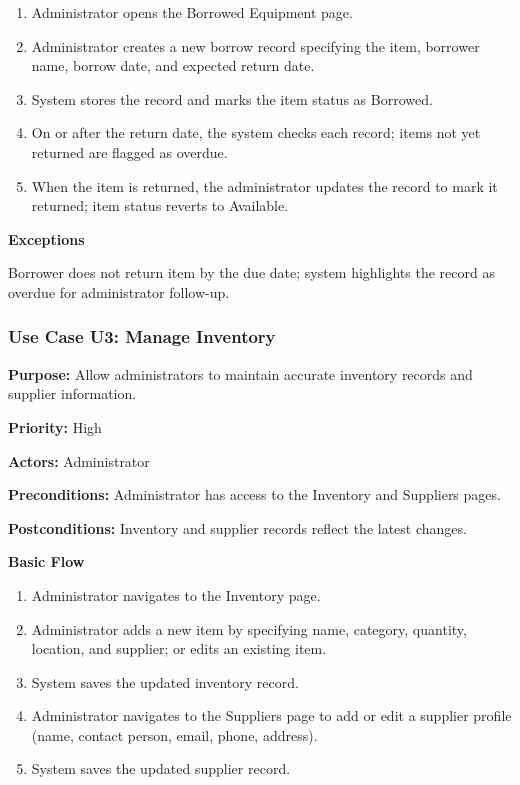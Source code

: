 \documentclass[12pt]{article}
\begin{document}
\begin{enumerate}
\item Administrator opens the Borrowed Equipment page.
\item Administrator creates a new borrow record specifying the item, borrower name, borrow date, and expected return date.
\item System stores the record and marks the item status as Borrowed.
\item On or after the return date, the system checks each record; items not yet returned are flagged as overdue.
\item When the item is returned, the administrator updates the record to mark it returned; item status reverts to Available.
\end{enumerate}

\textbf{Exceptions}

Borrower does not return item by the due date; system highlights the record as overdue for administrator follow-up.

\subsubsection{Use Case U3: Manage Inventory}

\textbf{Purpose:} Allow administrators to maintain accurate inventory records and supplier information.

\textbf{Priority:} High

\textbf{Actors:} Administrator

\textbf{Preconditions:} Administrator has access to the Inventory and Suppliers pages.

\textbf{Postconditions:} Inventory and supplier records reflect the latest changes.

\textbf{Basic Flow}

\begin{enumerate}
\item Administrator navigates to the Inventory page.
\item Administrator adds a new item by specifying name, category, quantity, location, and supplier; or edits an existing item.
\item System saves the updated inventory record.
\item Administrator navigates to the Suppliers page to add or edit a supplier profile (name, contact person, email, phone, address).
\item System saves the updated supplier record.
\end{enumerate}
\end{document}

